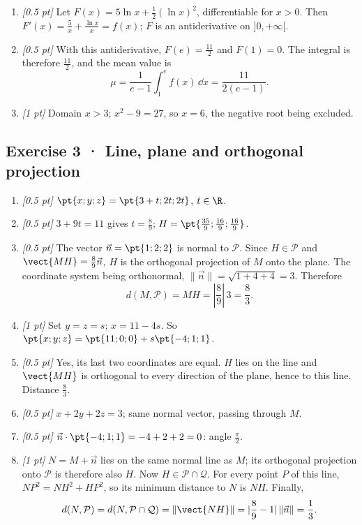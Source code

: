 \begin{enumerate}
\item \textit{[0.5 pt]} Let $F(x)=5\ln x+\frac12(\ln x)^2$, differentiable for $x>0$. Then $F'(x)=\frac{5}{x}+\frac{\ln x}{x}=f(x)$; $F$ is an antiderivative on $]0,+\infty[$.

\item \textit{[0.5 pt]} With this antiderivative, $F(e)=\frac{11}{2}$ and $F(1)=0$. The integral is therefore $\frac{11}{2}$, and the mean value is
\[\mu=\frac{1}{e-1}\int_1^e f(x)\,\dd x=\frac{11}{2(e-1)}.\]

\item \textit{[1 pt]} Domain $x>3$; $x^2-9=27$, so $x=6$, the negative root being excluded.

\end{enumerate}

\subsection*{Exercise 3 · Line, plane and orthogonal projection}\begin{enumerate}

\item \textit{[0.5 pt]} $\pt{x;y;z}=\pt{3+t;2t;2t}$, $t\in\R$.

\item \textit{[0.5 pt]} $3+9t=11$ gives $t=\frac{8}{9}$; $H=\pt{\frac{35}{9};\frac{16}{9};\frac{16}{9}}$.

\item \textit{[0.5 pt]} The vector $\vec n=\pt{1;2;2}$ is normal to $\mathcal P$. Since $H\in\mathcal P$ and $\vect{MH}=\frac{8}{9}\vec n$, $H$ is the orthogonal projection of $M$ onto the plane. The coordinate system being orthonormal, $\|\vec n\|=\sqrt{1+4+4}=3$. Therefore
\[d(M,\mathcal P)=MH=|\frac{8}{9}|\,3=\frac{8}{3}.\]

\item \textit{[1 pt]} Set $y=z=s$; $x=11-4s$. So $\pt{x;y;z}=\pt{11;0;0}+s\pt{-4;1;1}$.

\item \textit{[0.5 pt]} Yes, its last two coordinates are equal. $H$ lies on the line and $\vect{MH}$ is orthogonal to every direction of the plane, hence to this line. Distance $\frac{8}{3}$.

\item \textit{[0.5 pt]} $x+2y+2z=3$; same normal vector, passing through $M$.

\item \textit{[0.5 pt]} $\vec n\cdot\pt{-4;1;1}=-4+2+2=0$: angle $\frac{\pi}{2}$.

\item \textit{[1 pt]} $N=M+\vec n$ lies on the same normal line as $M$; its orthogonal projection onto $\mathcal P$ is therefore also $H$. Now $H\in\mathcal P\cap\mathcal Q$. For every point $P$ of this line, $NP^2=NH^2+HP^2$, so its minimum distance to $N$ is $NH$. Finally,
\[d(N,\mathcal P)=d(N,\mathcal P\cap\mathcal Q)=\|\vect{NH}\|=|\frac{8}{9}-1|\,\|\vec n\|=\frac{1}{3}.\]

\end{enumerate}

